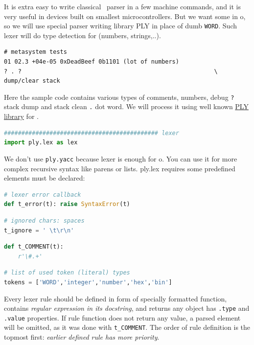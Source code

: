 It is
extra easy to write classical \F\ parser in a few machine commands, and it
is very useful in devices built on smallest microcontrollers.
But we want some  in o\F{}, so we will use special parser writing library
PLY in place of dumb \verb|WORD|. Such
lexer will do type detection for  (numbers, strings,..).

\clearpage
\begin{lstlisting}[language=Forth]
# metasystem tests
01 02.3 +04e-05 0xDeadBeef 0b1101 (lot of numbers)
? . ?														\ dump/clear stack
\end{lstlisting}
Here the sample code contains various types of comments, numbers, debug
\verb|?| stack dump and stack clean \verb|.| dot word. We will process it using
well known \href{http://www.dabeaz.com/ply/}{PLY library} for \py.
\begin{lstlisting}[language=Python]
############################################ lexer
import ply.lex as lex
\end{lstlisting}
We don't use \verb|ply.yacc| because lexer is enough for o\F. You can use it for
more complex recursive syntax like parens or lists.
\clearpage\noindent
ply.lex requires some predefined elements must be declared:

\begin{lstlisting}[language=Python]
# lexer error callback
def t_error(t): raise SyntaxError(t)
\end{lstlisting}
\begin{lstlisting}[language=Python]
# ignored chars: spaces
t_ignore = ' \t\r\n'
\end{lstlisting}
\begin{lstlisting}[language=Python]
def t_COMMENT(t):
    r'\#.+'
\end{lstlisting}
\begin{lstlisting}[language=Python]
# list of used token (literal) types
tokens = ['WORD','integer','number','hex','bin']
\end{lstlisting}
\clearpage\noindent
Every lexer rule should be defined in form of specially formatted function,
contains \emph{regular expression in its docstring}, and returns any object has
\verb|.type| and \verb|.value| properties. If rule function does not return any
value, a parsed element will be omitted, as it was done with \verb|t_COMMENT|.
The order of rule definition is the topmost first: \emph{earlier defined rule
has more priority}.

